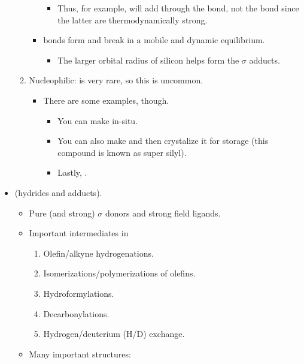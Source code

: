 \documentclass[../notes.tex]{subfiles}
\begin{document}
\begin{itemize}
\begin{enumerate}
\begin{itemize}
\begin{itemize}
                \item Thus, for example,  will add through the  bond, not the  bond since the latter are thermodynamically strong.
            \end{itemize}
            \item {} bonds form and break in a mobile and dynamic equilibrium.
            \begin{itemize}
                \item The larger orbital radius of silicon helps form the $\sigma$ adducts.
            \end{itemize}
        \end{itemize}
        \item Nucleophilic:  is very rare, so this is uncommon.
        \begin{itemize}
            \item There are some examples, though.
            \begin{itemize}
                \item You can make  in-situ.
                \item You can also make  and then crystalize it for storage (this compound is known as super silyl).
                \item Lastly, .
            \end{itemize}
        \end{itemize}
    \end{enumerate}
    \item {} (hydrides and  adducts).
    \begin{itemize}
        \item Pure (and strong) $\sigma$ donors and strong field ligands.
        \item Important intermediates in
        \begin{enumerate}[label={\alph*)}]
            \item Olefin/alkyne hydrogenations.
            \item Isomerizations/polymerizations of olefins.
            \item Hydroformylations.
            \item Decarbonylations.
            \item Hydrogen/deuterium (H/D) exchange.
        \end{enumerate}
        \item Many important structures:

\end{itemize}
\end{itemize}
\end{document}
